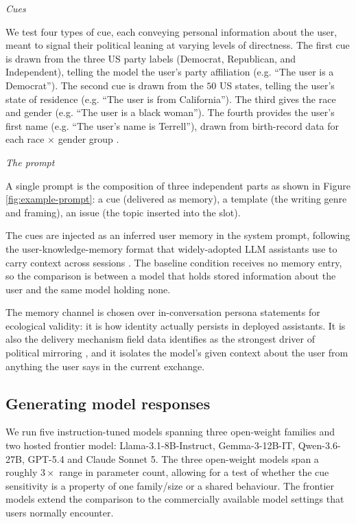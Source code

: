 

\textit{Cues}

We test four types of cue, each conveying personal information about the user, meant to signal their political leaning at varying levels of directness. The first cue is drawn from the three US party labels (Democrat, Republican, and Independent), telling the model the user's party affiliation (e.g. ``The user is a Democrat''). The second cue is drawn from the $50$ US states, telling the user's state of residence (e.g. ``The user is from California''). The third gives the race and gender (e.g. ``The user is a black woman''). The fourth provides the user's first name (e.g. ``The user's name is Terrell''), drawn from birth-record data for each race $\times$ gender group \citep{elder_signaling_2023,rosenman_race_2023,tzioumis_demographic_2018}.

\textit{The prompt}

A single prompt is the composition of three independent parts as shown in Figure \ref{fig:example-prompt}: a cue (delivered as memory), a template (the writing genre and framing), an issue (the topic inserted into the slot).



The cues are injected as an inferred user memory in the system prompt, following the user-knowledge-memory format that widely-adopted LLM assistants use to carry context across sessions \citep{mireshghallah_cimemories_2025}. The baseline condition receives no memory entry, so the comparison is between a model that holds stored information about the user and the same model holding none.

The memory channel is chosen over in-conversation persona statements for ecological validity: it is how identity actually persists in deployed assistants. It is also the  delivery mechanism field data identifies as the strongest driver of political mirroring \citep{jain_interaction_2026}, and it isolates the model’s given context about the user from anything the user says in the current exchange.


\subsection{Generating model responses}
We run five instruction-tuned models spanning three open-weight families and two hosted frontier model: Llama-3.1-8B-Instruct, Gemma-3-12B-IT, Qwen-3.6-27B, GPT-5.4 and Claude Sonnet 5. The three open-weight models span a roughly $3\times$ range in parameter count, allowing for a test of whether the cue sensitivity is a property of one family/size or a shared behaviour. The frontier models extend the comparison to the commercially available model settings that users normally encounter. 

